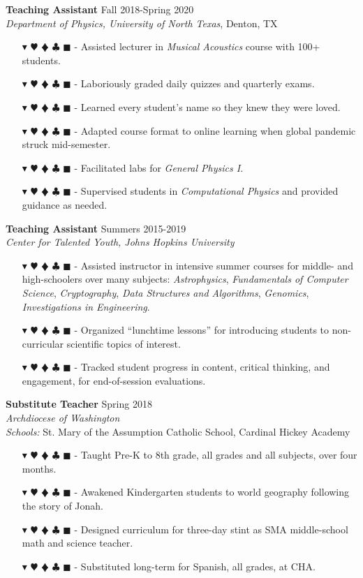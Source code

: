 \documentclass[overlapped, 10pt]{res} %
\newcommand{\physics}{$\blacktriangledown$}
\newcommand{\biochem}{$\varheartsuit$}
\newcommand{\shannon}{$\vardiamondsuit$}
\newcommand{\classic}{$\clubsuit$}
\newcommand{\quantum}{$\blacksquare$}
\newcommand{\physicscolor}{\color{YellowOrange}}
\newcommand{\biochemcolor}{\color{Emerald}}
\newcommand{\shannoncolor}{\color{Goldenrod}}
\newcommand{\classiccolor}{\color{Cyan}}
\newcommand{\quantumcolor}{\color{RedOrange}}
\newcommand{\tag}[1]{
    {\IfSubStr{#1}{\physics}{\physicscolor}{\color{White}}\physics}
    {\IfSubStr{#1}{\biochem}{\biochemcolor}{\color{White}}\biochem}
    {\IfSubStr{#1}{\shannon}{\shannoncolor}{\color{White}}\shannon}
    {\IfSubStr{#1}{\classic}{\classiccolor}{\color{White}}\classic}
    {\IfSubStr{#1}{\quantum}{\quantumcolor}{\color{White}}\quantum}
}
\begin{document}
\begin{resume}
\textbf{Teaching Assistant} \hfill Fall 2018-Spring 2020 \\
\textit{Department of Physics, University of North Texas}, Denton, TX
\begin{itemize} \itemsep -2pt %
\item[\tag{\physics}-] Assisted lecturer in \textit{Musical Acoustics} course with 100+ students.
\item[\tag{}-] Laboriously graded daily quizzes and quarterly exams.
\item[\tag{}-] Learned every student's name so they knew they were loved.
\item[\tag{}-] Adapted course format to online learning when global pandemic struck mid-semester.
\item[\tag{\physics}-] Facilitated labs for \textit{General Physics I}.
\item[\tag{\physics\classic}-] Supervised students in \textit{Computational Physics} and provided guidance as needed.
\end{itemize}

\textbf{Teaching Assistant} \hfill Summers 2015-2019 \\
\textit{Center for Talented Youth, Johns Hopkins University}
\begin{itemize} \itemsep -2pt %
\item[\tag{\physics\biochem\shannon\classic}-] Assisted instructor in intensive summer courses for middle- and high-schoolers over many subjects: \textit{Astrophysics}, \textit{Fundamentals of Computer Science}, \textit{Cryptography}, \textit{Data Structures and Algorithms}, \textit{Genomics}, \textit{Investigations in Engineering}.
\item[\tag{\physics\biochem\shannon\classic\quantum}-] Organized ``lunchtime lessons'' for introducing students to non-curricular scientific topics of interest.
\item[\tag{}-] Tracked student progress in content, critical thinking, and engagement, for end-of-session evaluations.
\end{itemize}

\textbf{Substitute Teacher} \hfill Spring 2018 \\
\textit{Archdiocese of Washington} \\
\textit{Schools:} St. Mary of the Assumption Catholic School, Cardinal Hickey Academy
\begin{itemize} \itemsep -2pt %
\item[\tag{\physics\biochem\classic}-] Taught Pre-K to 8th grade, all grades and all subjects, over four months.
\item[\tag{}-] Awakened Kindergarten students to world geography following the story of Jonah.
\item[\tag{\physics\biochem}-] Designed curriculum for three-day stint as SMA middle-school math and science teacher.
\item[\tag{}-] Substituted long-term for Spanish, all grades, at CHA.
\end{itemize}


\end{resume}
\end{document}
